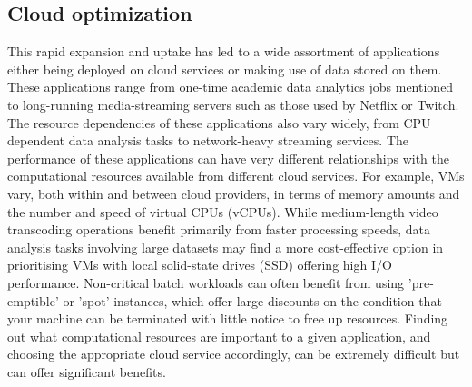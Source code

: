 \documentclass{report}
\begin{document}
\subsection{Cloud optimization}
This rapid expansion and uptake has led to a wide assortment of applications either being deployed on cloud services or making use of data stored on them. These applications range from one-time academic data analytics jobs mentioned to long-running media-streaming servers such as those used by Netflix or Twitch\cite{Bilal2017}. The resource dependencies of these applications also vary widely, from CPU dependent data analysis tasks to network-heavy streaming services. The performance of these applications can have very different relationships with the computational resources available from different cloud services. For example, VMs vary, both within and between cloud providers, in terms of memory amounts and the number and speed of virtual CPUs (vCPUs). While medium-length video transcoding operations benefit primarily from faster processing speeds, data analysis tasks involving large datasets may find a more cost-effective option in prioritising VMs with local solid-state drives (SSD) offering high I/O performance. Non-critical batch workloads can often benefit from using 'pre-emptible' or 'spot' instances, which offer large discounts on the condition that your machine can be terminated with little notice to free up resources. Finding out what computational resources are important to a given application, and choosing the appropriate cloud service accordingly, can be extremely difficult but can offer significant benefits.
\end{document}
